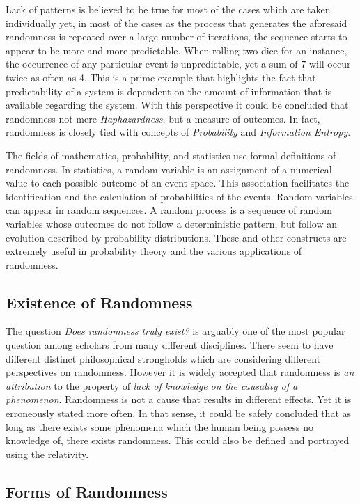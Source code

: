 Lack of patterns is believed to be true for most of the cases which are taken individually yet, in most of the cases as the process that generates the aforesaid randomness is repeated over a large number of iterations, the sequence starts to appear to be more and more predictable. When rolling two dice for an instance, the occurrence of any particular event is unpredictable, yet a sum of $7$ will occur twice as often as 4. This is a prime example that highlights the fact that predictability of a system is dependent on the amount of information that is available regarding the system. With this perspective it could be concluded that randomness not mere \textit{Haphazardness}, but a measure of outcomes. In fact, randomness is closely tied with concepts of \textit{Probability} and \textit{Information Entropy}.

The fields of mathematics, probability, and statistics use formal definitions of randomness. In statistics, a random variable is an assignment of a numerical value to each possible outcome of an event space. This association facilitates the identification and the calculation of probabilities of the events. Random variables can appear in random sequences. A random process is a sequence of random variables whose outcomes do not follow a deterministic pattern, but follow an evolution described by probability distributions. These and other constructs are extremely useful in probability theory and the various applications of randomness.

\subsection{Existence of Randomness}

The question \textit{Does randomness truly exist?} is arguably one of the most popular question among scholars from many different disciplines. There seem to have different distinct philosophical strongholds which are considering different perspectives on randomness. However it is widely accepted that randomness is \textit{an attribution} to the property of \textit{lack of knowledge on the causality of a phenomenon}. Randomness is not a cause that results in different effects. Yet it is erroneously stated more often. In that sense, it could be safely concluded that as long as there exists some phenomena which the human being possess no knowledge of, there exists randomness. This could also be defined and portrayed using the relativity. 

\subsection{Forms of Randomness}

